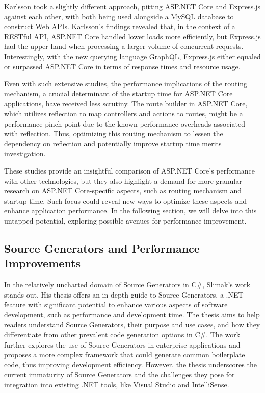 Karlsson \cite{Karlsson2021} took a slightly different approach, pitting ASP.NET Core and Express.js against each other, with both being used alongside a MySQL database to construct Web APIs. Karlsson's findings revealed that, in the context of a RESTful API, ASP.NET Core handled lower loads more efficiently, but Express.js had the upper hand when processing a larger volume of concurrent requests. Interestingly, with the new querying language GraphQL, Express.js either equaled or surpassed ASP.NET Core in terms of response times and resource usage.

Even with such extensive studies, the performance implications of the routing mechanism, a crucial determinant of the startup time for ASP.NET Core applications, have received less scrutiny. The route builder in ASP.NET Core, which utilizes reflection to map controllers and actions to routes, might be a performance pinch point due to the known performance overheads associated with reflection. Thus, optimizing this routing mechanism to lessen the dependency on reflection and potentially improve startup time merits investigation.

These studies provide an insightful comparison of ASP.NET Core's performance with other technologies, but they also highlight a demand for more granular research on ASP.NET Core-specific aspects, such as routing mechanism and startup time. Such focus could reveal new ways to optimize these aspects and enhance application performance. In the following section, we will delve into this untapped potential, exploring possible avenues for performance improvement.

\subsection{Source Generators and Performance Improvements}

In the relatively uncharted domain of Source Generators in C\#, Slimak's work \cite{Slimak2022} stands out. His thesis offers an in-depth guide to Source Generators, a .NET feature with significant potential to enhance various aspects of software development, such as performance and development time. The thesis aims to help readers understand Source Generators, their purpose and use cases, and how they differentiate from other prevalent code generation options in C\#. The work further explores the use of Source Generators in enterprise applications and proposes a more complex framework that could generate common boilerplate code, thus improving development efficiency. However, the thesis underscores the current immaturity of Source Generators and the challenges they pose for integration into existing .NET tools, like Visual Studio and IntelliSense.

